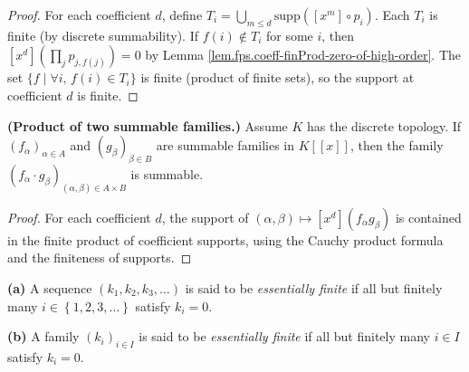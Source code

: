 \begin{proof}
For each coefficient $d$, define $T_i = \bigcup_{m\le d}
\mathrm{supp}([x^m]\circ p_i)$. Each $T_i$ is finite (by discrete summability).
If $f(i)\notin T_i$ for some $i$, then $[x^d](\prod_j p_{j,f(j)}) = 0$
by Lemma \ref{lem.fps.coeff-finProd-zero-of-high-order}.
The set $\{f \mid \forall i,\, f(i)\in T_i\}$ is finite (product of finite
sets), so the support at coefficient $d$ is finite.
\end{proof}

\begin{lemma}
\label{lem.fps.summable-prod-of-summable-discrete}
\leanhelper
\leanok
\textbf{(Product of two summable families.)}
Assume $K$ has the discrete topology. If $(f_\alpha)_{\alpha\in A}$ and
$(g_\beta)_{\beta\in B}$ are summable families in $K[[x]]$, then the family
$(f_\alpha\cdot g_\beta)_{(\alpha,\beta)\in A\times B}$ is summable.
\end{lemma}

\begin{proof}
\leanok
For each coefficient $d$, the support of
$(\alpha,\beta)\mapsto [x^d](f_\alpha g_\beta)$ is contained in the
finite product of coefficient supports, using the Cauchy product formula
and the finiteness of supports.
\end{proof}

\begin{definition}
\label{def.fps.prodrule.ess-fin}
\leantarget
\leanok
\textbf{(a)} A sequence $\left(  k_{1}%
,k_{2},k_{3},\ldots\right)  $ is said to be \emph{essentially finite} if all
but finitely many $i\in\left\{  1,2,3,\ldots\right\}  $ satisfy $k_{i}=0$.
\medskip

\textbf{(b)} A family $\left(  k_{i}\right)  _{i\in I}$ is said to be
\emph{essentially finite} if all but finitely many $i\in I$ satisfy $k_{i}=0$.
\end{definition}


